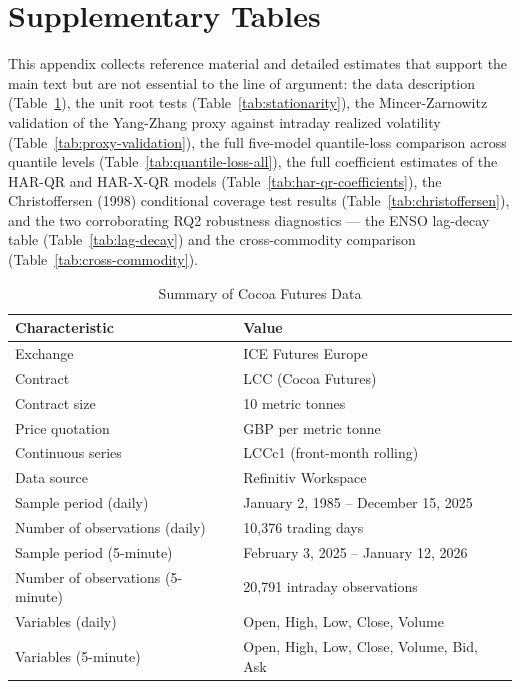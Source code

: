 
\section{Supplementary Tables}
\label{app:supplementary}

This appendix collects reference material and detailed estimates that support
the main text but are not essential to the line of argument: the data
description (Table~\ref{tab:data-summary}), the unit root tests
(Table~\ref{tab:stationarity}), the Mincer-Zarnowitz validation of the Yang-Zhang proxy against
intraday realized volatility (Table~\ref{tab:proxy-validation}), the full
five-model quantile-loss comparison across quantile levels
(Table~\ref{tab:quantile-loss-all}), the full
coefficient estimates of the HAR-QR and HAR-X-QR models
(Table~\ref{tab:har-qr-coefficients}), the Christoffersen (1998)
conditional coverage test results (Table~\ref{tab:christoffersen}), and
the two corroborating RQ2 robustness diagnostics --- the ENSO lag-decay
table (Table~\ref{tab:lag-decay}) and the cross-commodity comparison
(Table~\ref{tab:cross-commodity}).

\begin{table}[htbp]
\centering
\caption{Summary of Cocoa Futures Data}
\label{tab:data-summary}
\begin{tabular}{ll}
\toprule
\textbf{Characteristic} & \textbf{Value} \\
\midrule
Exchange & ICE Futures Europe \\
Contract & LCC (Cocoa Futures) \\
Contract size & 10 metric tonnes \\
Price quotation & GBP per metric tonne \\
Continuous series & LCCc1 (front-month rolling) \\
Data source & Refinitiv Workspace \\
Sample period (daily) & January 2, 1985 -- December 15, 2025 \\
Number of observations (daily) & 10,376 trading days \\
Sample period (5-minute) & February 3, 2025 -- January 12, 2026 \\
Number of observations (5-minute) & 20,791 intraday observations \\
Variables (daily) & Open, High, Low, Close, Volume \\
Variables (5-minute) & Open, High, Low, Close, Volume, Bid, Ask \\
\bottomrule
\end{tabular}
\end{table}

